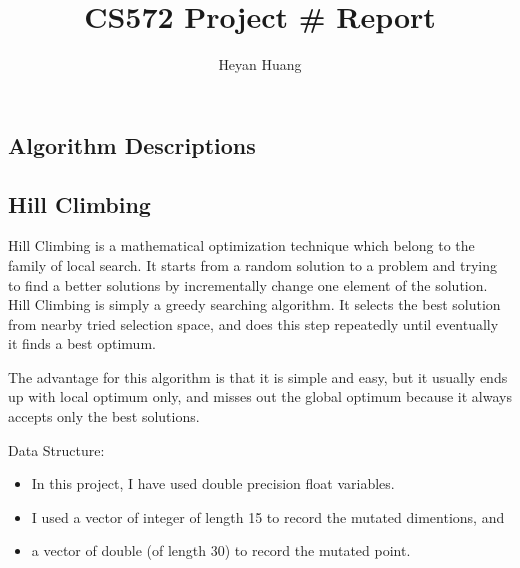 \documentclass{article}
\title{CS572 Project \# Report}
\author{Heyan Huang}
\begin{document}
\begin{CJK}{UTF8}{gbsn}
\maketitle


\lstset{language=c++,
numbers=left, 
numberstyle=\tiny, 
escapeinside=``, 
extendedchars=false %
}


\section{Algorithm Descriptions}
\subsection{Hill Climbing}
   Hill Climbing is a mathematical optimization technique which belong to the family of local search. It starts from a random solution to a problem and trying to find a better solutions by incrementally change one element of the solution. Hill Climbing is simply a greedy searching algorithm. It selects the best solution from nearby tried selection space, and does this step repeatedly until eventually it finds a best optimum. 

The advantage for this algorithm is that it is simple and easy, but it usually ends up with local optimum only, and misses out the global optimum because it always accepts only the best solutions.
\begin{description}
\item Data Structure: 
  \begin{itemize}
    \itemsep=-3pt
  \item In this project, I have used double precision float variables. 
  \item I used a vector of integer of length 15 to record the mutated dimentions, and
  \item a vector of double (of length 30) to record the mutated point. 
  \end{itemize}


\end{description}
\end{CJK}
\end{document}
